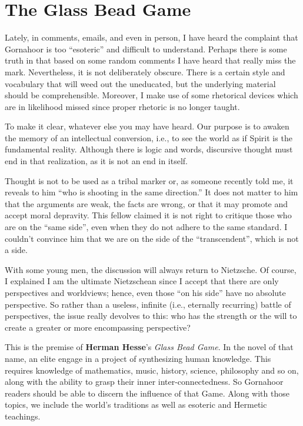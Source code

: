 \section{The Glass Bead Game}

Lately, in comments, emails, and even in person, I have heard the complaint that Gornahoor is too ``esoteric'' and difficult to understand. Perhaps there is some truth in that based on some random comments I have heard that really miss the mark. Nevertheless, it is not deliberately obscure. There is a certain style and vocabulary that will weed out the uneducated, but the underlying material should be comprehensible. Moreover, I make use of some rhetorical devices which are in likelihood missed since proper rhetoric is no longer taught.

To make it clear, whatever else you may have heard. Our purpose is to awaken the memory of an intellectual conversion, i.e., to see the world as if Spirit is the fundamental reality. Although there is logic and words, discursive thought must end in that realization, as it is not an end in itself.

Thought is not to be used as a tribal marker or, as someone recently told me, it reveals to him ``who is shooting in the same direction.'' It does not matter to him that the arguments are weak, the facts are wrong, or that it may promote and accept moral depravity. This fellow claimed it is not right to critique those who are on the ``same side'', even when they do not adhere to the same standard. I couldn't convince him that we are on the side of the ``transcendent'', which is not a side.

With some young men, the discussion will always return to Nietzsche. Of course, I explained I am the ultimate Nietzschean since I accept that there are only perspectives and worldviews; hence, even those ``on his side'' have no absolute perspective. So rather than a useless, infinite (i.e., eternally recurring) battle of perspectives, the issue really devolves to this: who has the strength or the will to create a greater or more encompassing perspective?

This is the premise of \textbf{Herman Hesse}'s \emph{Glass Bead Game}. In the novel of that name, an elite engage in a project of synthesizing human knowledge. This requires knowledge of mathematics, music, history, science, philosophy and so on, along with the ability to grasp their inner inter-connectedness. So Gornahoor readers should be able to discern the influence of that Game. Along with those topics, we include the world's traditions as well as esoteric and Hermetic teachings.

